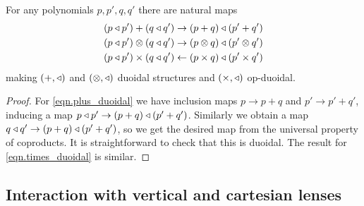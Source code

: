 \documentclass[Book-Poly]{subfiles}
\begin{document}
\begin{proposition}
For any polynomials $p,p',q,q'$ there are natural maps
\begin{align}\label{eqn.plus_duoidal}
	(p\mathbin{\triangleleft} p')+(q\mathbin{\triangleleft} q')&\to (p+q)\mathbin{\triangleleft}(p'+q')\\\label{eqn.otimes_duoidal}
	(p\mathbin{\triangleleft} p')\otimes(q\mathbin{\triangleleft} q')&\to(p\otimes q)\mathbin{\triangleleft}(p'\otimes q')\\\label{eqn.times_duoidal}
	(p\mathbin{\triangleleft} p')\times (q\mathbin{\triangleleft} q')&\leftarrow(p\times q)\mathbin{\triangleleft}(p'\times q')
\end{align}
making $(+,\mathbin{\triangleleft})$ and $(\otimes,\mathbin{\triangleleft})$ duoidal structures and $(\times,\mathbin{\triangleleft})$ op-duoidal.
\end{proposition}
\begin{proof}
For \eqref{eqn.plus_duoidal} we have inclusion maps $p\to p+q$ and $p'\to p'+q'$, inducing a map $p\mathbin{\triangleleft} p'\to(p+q)\mathbin{\triangleleft}(p'+q')$. Similarly we obtain a map $q\mathbin{\triangleleft} q'\to(p+q)\mathbin{\triangleleft}(p'+q')$, so we get the desired map from the universal property of coproducts. It is straightforward to check that this is duoidal. The result for \eqref{eqn.times_duoidal} is similar. 
\end{proof}


\subsection{Interaction with vertical and cartesian lenses} \label{subsec.comon.comp.prop.cart}
\end{document}
